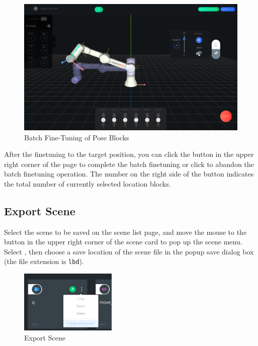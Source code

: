 \begin{figure}[hb]
	\centering
	\includegraphics[width=\textwidth]{en/image/poses.png}
	\caption{Batch Fine-Tuning of Pose Blocks}
	\label{fig:批量微调位置块}
\end{figure}

After the fine­tuning to the target position, you can click the  button in the upper right corner of the page to complete the batch fine­tuning or click  to abandon the batch fine­tuning operation. The number on the right side of the  button indicates the total number of currently selected location blocks.

\clearpage

\subsection{Export Scene}
\label{sec:导出场景}
Select the scene to be saved on the scene list page, and move the mouse to the  button in the upper right corner of the scene card to pop up the scene menu. Select , then choose a save location of the scene file in the pop­up save dialog box (the file extension is \verb|lbd|).

\begin{figure}[htb!]
	\centering
	\includegraphics[height=3cm]{en/image/3-19.png}
	\caption{Export Scene}
	\label{fig:导出场景}
\end{figure}

